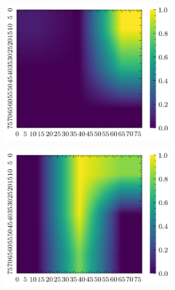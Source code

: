 \begin{figure}[H]
    \begin{subfigure}[b]{0.19\textwidth}
        \includegraphics[width=\linewidth]{../img/5/quarry/false_negative/grad-cam-2d-0.png}
    \end{subfigure}
    \begin{subfigure}[b]{0.19\textwidth}
        \includegraphics[width=\linewidth]{../img/5/quarry/false_negative/grad-cam-2d-1.png}
    \end{subfigure}  
    \begin{subfigure}[b]{0.19\textwidth}

\end{subfigure}
\end{figure}
